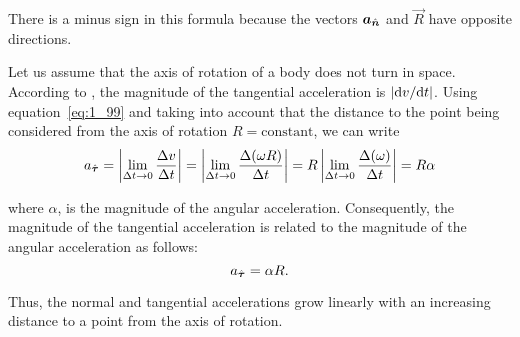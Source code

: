 \noindent
There is a minus sign in this formula because the vectors $\boldsymbol{a}_{\hat{\boldsymbol{n}}}$ and $\vec{R}$ have opposite directions.

Let us assume that the axis of rotation of a body does not turn in space. According to , the magnitude of the tangential acceleration is $|\mathrm{d} v/\mathrm{d} t|$. Using equation~\eqref{eq:1_99} and taking into account that the distance to the point being considered from the axis of rotation $R=\text{constant}$, we can write
\begin{equation*}
a_{\hat{\boldsymbol{\tau}}} = \left| \lim_{\Delta t\to 0} \frac{\Delta v}{\Delta t} \right| = \left| \lim_{\Delta t\to 0} \frac{\Delta(\omega R)}{\Delta t} \right| = R \left| \lim_{\Delta t\to 0} \frac{\Delta(\omega)}{\Delta t} \right| = R\alpha
\end{equation*}

\noindent
where $\alpha$, is the magnitude of the angular acceleration. Consequently, the magnitude of the tangential acceleration is related to the magnitude of the angular acceleration as follows:
\begin{equation}\label{eq:1_103}
a_{\hat{\boldsymbol{\tau}}} = \alpha R.
\end{equation}

Thus, the normal and tangential accelerations grow linearly with an increasing distance to a point from the axis of rotation.
